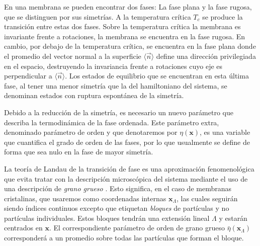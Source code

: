 En una membrana se pueden encontrar dos fases: La fase plana y la fase
rugosa, que se distinguen por sus simetrías. A la temperatura crítica $T_c$ se
produce la transición entre estas dos fases. Sobre la temperatura crítica la
membrana es invariante frente a rotaciones, 
la membrana se encuentra en la fase rugosa. En cambio, por debajo de la temperatura
crítica, se encuentra en la fase plana donde el promedio del vector normal a
la superficie $\langle \vec{n}\rangle$ define una dirección privilegiada en el
espacio, destruyendo la invariancia frente a rotaciones cuyo eje es
perpendicular a $\langle \vec{n}\rangle$. Los estados de equilibrio que se
encuentran en esta última fase, al tener una menor simetría que la del
hamiltoniano del sistema, se denominan estados con ruptura espontánea de la
simetría. 
 
Debido a la reducción de la simetría, es necesario un nuevo parámetro que 
describa la termodinámica de la fase ordenada. Este parámetro
extra, denominado parámetro de orden y que denotaremos por $\eta(\mathbf{x})$,
es una 
variable que cuantifica el grado de orden de
las fases, por lo que usualmente se define de forma que sea nulo en la fase
de mayor simetría.

\begin{figure}[h]
\centering
{}
\quad
{}
\end{figure}

La teoría de Landau de la transición de fase es una aproximación
fenomenológica que evita tratar con la descripción microscópica del sistema
mediante el uso de una descripción de \textit{grano grueso}
\cite{Goldenfield:Lecture_Notes}. Esto significa, 
en el caso de membranas cristalinas, que usaremos como coordenadas internas
$\mathbf{x}_{\Lambda}$, las cuales seguirán  siendo índices continuos excepto
que etiquetan \textit{bloques} de partículas y no partículas
individuales. Estos bloques tendrán una extensión lineal $\Lambda$ y estarán
centrados en $\mathbf{x}$. El correspondiente parámetro de orden de grano
grueso $\bar{\eta}(\mathbf{x}_{\Lambda})$ corresponderá a un promedio sobre
todas las partículas que forman el bloque.

